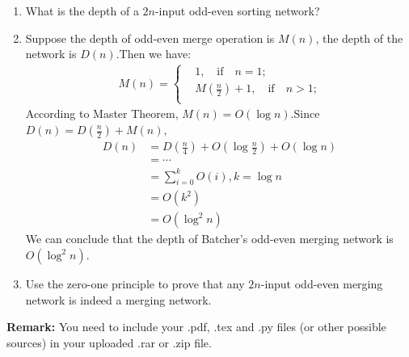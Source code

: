 \documentclass[12pt,a4paper,UTF8]{article}
\makeatletter
\newtheorem*{solution}{Solution}
\theoremstyle{definition}
\renewenvironment{solution}[1][Solution] {\par\pushQED{\qed}\normalfont\topsep6\p@\@plus6\p@\relax\trivlist\item[\hskip\labelsep\bfseries#1\@addpunct{.}]\ignorespaces}{\popQED\endtrivlist\@endpefalse} \makeatother
\makeatother
\begin{document}
\begin{enumerate}
\begin{enumerate}
    	\item What is the depth of a $2n$-input odd-even sorting network?
    	\begin{solution}
    		Suppose the depth of odd-even merge operation is $ M(n) $, the depth of the network is $ D(n) $.Then we have:
    		\begin{align*}
    			M(n) = \begin{cases}
    			&1 ,\quad \text{if}\quad n = 1 \text{;}\\
    			&M(\frac{n}{2}) + 1 ,\quad \text{if}\quad n > 1 \text{;}\\
    			\end{cases}
    		\end{align*}
    		According to Master Theorem, $ M(n) = O(\log n) $.Since $ D(n) = D(\frac{n}{2}) + M(n) $, 
    		\begin{align*}
    			D(n) &= D(\frac{n}{4}) + O(\log \frac{n}{2}) + O(\log n)\\
    				 &= \cdots\\
    				 &= \sum_{i = 0}^{k} O(i), k = \log n\\
    				 &= O(k^2)\\
    				 &= O(\log^2 n)
    		\end{align*}
    		We can conclude that the depth of Batcher's odd-even merging network is $ O(\log^2 n) $.
    	\end{solution}
    	\item
    	{\color{red}{(Optional Sub-question with Bonus)}} Use the zero-one principle to prove that any $2n$-input odd-even merging network is indeed a merging network.
    	
    \end{enumerate}

\end{enumerate}

\vspace{20pt}

\textbf{Remark:} You need to include your .pdf, .tex and .py files (or other possible sources) in your uploaded .rar or .zip file.

\end{document}
